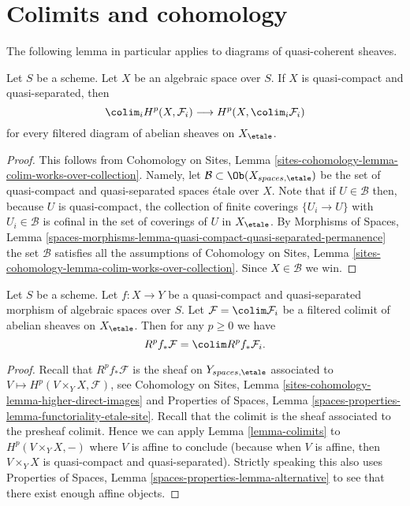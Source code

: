 \section{Colimits and cohomology}
\label{section-colimits}

\noindent
The following lemma in particular applies to diagrams of quasi-coherent
sheaves.

\begin{lemma}
\label{lemma-colimits}
Let $S$ be a scheme. Let $X$ be an algebraic space over $S$.
If $X$ is quasi-compact and quasi-separated, then
$$
\colim_i H^p(X, \mathcal{F}_i)
\longrightarrow
H^p(X, \colim_i \mathcal{F}_i)
$$
for every filtered diagram of abelian sheaves on $X_\etale$.
\end{lemma}

\begin{proof}
This follows from
Cohomology on Sites, Lemma
\ref{sites-cohomology-lemma-colim-works-over-collection}.
Namely, let $\mathcal{B} \subset \Ob(X_{spaces, \etale})$
be the set of quasi-compact and quasi-separated spaces \'etale over $X$.
Note that if $U \in \mathcal{B}$ then, because $U$ is quasi-compact,
the collection of finite coverings $\{U_i \to U\}$ with $U_i \in \mathcal{B}$
is cofinal in the set of coverings of $U$ in $X_\etale$. By
Morphisms of Spaces, Lemma
\ref{spaces-morphisms-lemma-quasi-compact-quasi-separated-permanence}
the set $\mathcal{B}$ satisfies all the assumptions of
Cohomology on Sites, Lemma
\ref{sites-cohomology-lemma-colim-works-over-collection}.
Since $X \in \mathcal{B}$ we win.
\end{proof}

\begin{lemma}
\label{lemma-colimit-cohomology}
Let $S$ be a scheme. Let $f : X \to Y$ be a quasi-compact and quasi-separated
morphism of algebraic spaces over $S$. Let $\mathcal{F} = \colim \mathcal{F}_i$
be a filtered colimit of abelian sheaves on $X_\etale$.
Then for any $p \geq 0$ we have
$$
R^pf_*\mathcal{F} = \colim R^pf_*\mathcal{F}_i.
$$
\end{lemma}

\begin{proof}
Recall that $R^pf_*\mathcal{F}$ is the sheaf on $Y_{spaces, \etale}$
associated to $V \mapsto H^p(V \times_Y X, \mathcal{F})$, see
Cohomology on Sites, Lemma \ref{sites-cohomology-lemma-higher-direct-images}
and Properties of Spaces, Lemma
\ref{spaces-properties-lemma-functoriality-etale-site}.
Recall that the colimit is the sheaf associated to the presheaf colimit.
Hence we can apply Lemma \ref{lemma-colimits}
to $H^p(V \times_Y X, -)$ where $V$ is affine to conclude (because
when $V$ is affine, then $V \times_Y X$ is quasi-compact and quasi-separated).
Strictly speaking this also uses Properties of Spaces,
Lemma \ref{spaces-properties-lemma-alternative} to see that there exist
enough affine objects.
\end{proof}

